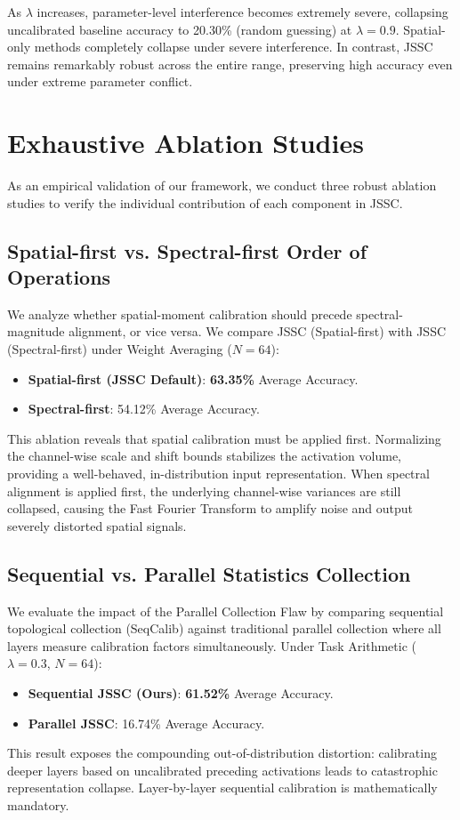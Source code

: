 \documentclass{article}
\begin{document}
As $\lambda$ increases, parameter-level interference becomes extremely severe, collapsing uncalibrated baseline accuracy to 20.30\% (random guessing) at $\lambda = 0.9$. Spatial-only methods completely collapse under severe interference. In contrast, JSSC remains remarkably robust across the entire range, preserving high accuracy even under extreme parameter conflict.

\section{Exhaustive Ablation Studies}
\label{sec:ablations}

As an empirical validation of our framework, we conduct three robust ablation studies to verify the individual contribution of each component in JSSC.

\subsection{Spatial-first vs. Spectral-first Order of Operations}
We analyze whether spatial-moment calibration should precede spectral-magnitude alignment, or vice versa. We compare JSSC (Spatial-first) with JSSC (Spectral-first) under Weight Averaging ($N=64$):
\begin{itemize}
    \item \textbf{Spatial-first (JSSC Default)}: \textbf{63.35\%} Average Accuracy.
    \item \textbf{Spectral-first}: 54.12\% Average Accuracy.
\end{itemize}
This ablation reveals that spatial calibration must be applied first. Normalizing the channel-wise scale and shift bounds stabilizes the activation volume, providing a well-behaved, in-distribution input representation. When spectral alignment is applied first, the underlying channel-wise variances are still collapsed, causing the Fast Fourier Transform to amplify noise and output severely distorted spatial signals.

\subsection{Sequential vs. Parallel Statistics Collection}
We evaluate the impact of the Parallel Collection Flaw by comparing sequential topological collection (SeqCalib) against traditional parallel collection where all layers measure calibration factors simultaneously. Under Task Arithmetic ($\lambda = 0.3$, $N=64$):
\begin{itemize}
    \item \textbf{Sequential JSSC (Ours)}: \textbf{61.52\%} Average Accuracy.
    \item \textbf{Parallel JSSC}: 16.74\% Average Accuracy.
\end{itemize}
This result exposes the compounding out-of-distribution distortion: calibrating deeper layers based on uncalibrated preceding activations leads to catastrophic representation collapse. Layer-by-layer sequential calibration is mathematically mandatory.
\end{document}

